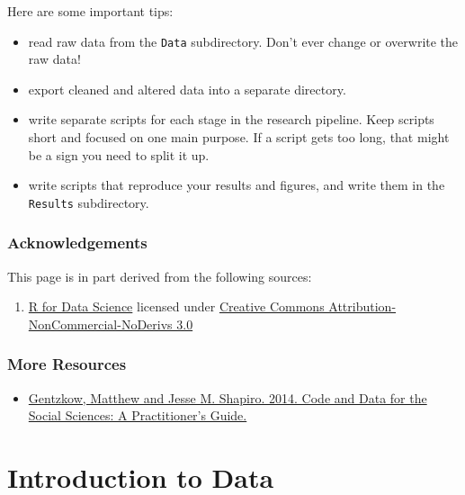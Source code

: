 \documentclass[]{book}
\providecommand{\tightlist}{%
  \setlength{\itemsep}{0pt}\setlength{\parskip}{0pt}}
\begin{document}
Here are some important tips:

\begin{itemize}
\tightlist
\item
  read raw data from the \texttt{Data} subdirectory. Don't ever change or overwrite the raw data!
\item
  export cleaned and altered data into a separate directory.
\item
  write separate scripts for each stage in the research pipeline. Keep scripts short and focused on one main purpose. If a script gets too long, that might be a sign you need to split it up.
\item
  write scripts that reproduce your results and figures, and write them in the \texttt{Results} subdirectory.
\end{itemize}

\hypertarget{acknowledgements}{%
\subsubsection*{Acknowledgements}\label{acknowledgements}}

This page is in part derived from the following sources:

\begin{enumerate}
\def\labelenumi{\arabic{enumi}.}
\tightlist
\item
  \href{https://r4ds.had.co.nz}{R for Data Science} licensed under \href{https://creativecommons.org/licenses/by-nc-nd/3.0/us/}{Creative Commons Attribution-NonCommercial-NoDerivs 3.0}
\end{enumerate}

\hypertarget{more-resources}{%
\subsubsection*{More Resources}\label{more-resources}}

\begin{itemize}
\tightlist
\item
  \href{https://web.stanford.edu/~gentzkow/research/CodeAndData.pdf}{Gentzkow, Matthew and Jesse M. Shapiro. 2014. Code and Data for the Social Sciences: A Practitioner's Guide.}
\end{itemize}

\hypertarget{introduction-to-data}{%
\section{Introduction to Data}\label{introduction-to-data}}
\end{document}
